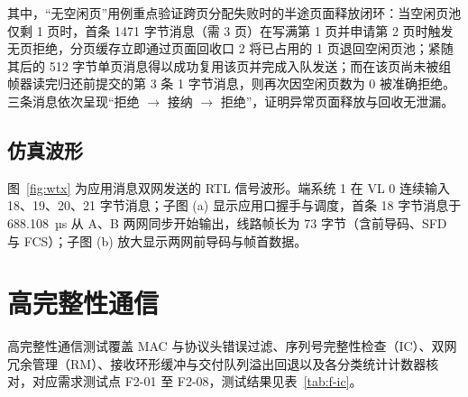 其中，“无空闲页”用例重点验证跨页分配失败时的半途页面释放闭环：当空闲页池仅剩 1 页时，首条 1471 字节消息（需 3 页）在写满第 1 页并申请第 2 页时触发无页拒绝，分页缓存立即通过页面回收口 2 将已占用的 1 页退回空闲页池；紧随其后的 512 字节单页消息得以成功复用该页并完成入队发送；而在该页尚未被组帧器读完归还前提交的第 3 条 1 字节消息，则再次因空闲页数为 0 被准确拒绝。三条消息依次呈现“拒绝 $\rightarrow$ 接纳 $\rightarrow$ 拒绝”，证明异常页面释放与回收无泄漏。

\subsection{仿真波形}

图~\ref{fig:wtx} 为应用消息双网发送的 RTL 信号波形。端系统 1 在 VL 0 连续输入 18、19、20、21 字节消息；子图 (a) 显示应用口握手与调度，首条 18 字节消息于 688.108~µs 从 A、B 两网同步开始输出，线路帧长为 73 字节（含前导码、SFD 与 FCS）；子图 (b) 放大显示两网前导码与帧首数据。


\FloatBarrier
\section{高完整性通信}\label{sec:f-ic}

高完整性通信测试覆盖 MAC 与协议头错误过滤、序列号完整性检查（IC）、双网冗余管理（RM）、接收环形缓冲与交付队列溢出回退以及各分类统计计数器核对，对应需求测试点 F2-01 至 F2-08，测试结果见表~\ref{tab:f-ic}。

